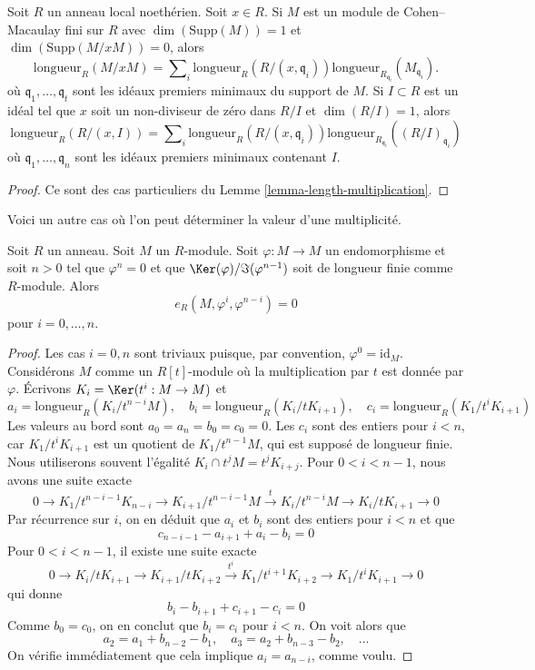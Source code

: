 \begin{lemma}
\label{lemma-additivity-divisors-restricted}
Soit $R$ un anneau local noethérien.
Soit $x \in R$. Si $M$ est un module de Cohen--Macaulay fini sur $R$
avec $\dim(\text{Supp}(M)) = 1$ et $\dim(\text{Supp}(M/xM)) = 0$, alors
$$
\text{longueur}_R(M/xM)
=
\sum\nolimits_i \text{longueur}_R(R/(x, \mathfrak q_i))
\text{longueur}_{R_{\mathfrak q_i}}(M_{\mathfrak q_i}).
$$
où $\mathfrak q_1, \ldots, \mathfrak q_t$ sont les idéaux premiers
minimaux du support de $M$. Si $I \subset R$ est un idéal
tel que $x$ soit un non-diviseur de zéro dans $R/I$ et $\dim(R/I) = 1$, alors
$$
\text{longueur}_R(R/(x, I))
=
\sum\nolimits_i \text{longueur}_R(R/(x, \mathfrak q_i))
\text{longueur}_{R_{\mathfrak q_i}}((R/I)_{\mathfrak q_i})
$$
où $\mathfrak q_1, \ldots, \mathfrak q_n$ sont les idéaux premiers minimaux
contenant $I$.
\end{lemma}

\begin{proof}
Ce sont des cas particuliers du Lemme \ref{lemma-length-multiplication}.
\end{proof}

\noindent
Voici un autre cas où l'on peut déterminer la valeur d'une multiplicité.

\begin{lemma}
\label{lemma-powers-period-length-zero}
Soit $R$ un anneau. Soit $M$ un $R$-module.
Soit $\varphi : M \to M$ un endomorphisme et soit $n > 0$
tel que $\varphi^n = 0$ et que $\Ker(\varphi)/\Im(\varphi^{n - 1})$
soit de longueur finie comme $R$-module.
Alors
$$
e_R(M, \varphi^i, \varphi^{n - i}) = 0
$$
pour $i = 0, \ldots, n$.
\end{lemma}

\begin{proof}
Les cas $i = 0, n$ sont triviaux puisque, par convention, $\varphi^0 = \text{id}_M$.
Considérons $M$ comme un $R[t]$-module où la multiplication par $t$
est donnée par $\varphi$. Écrivons
$K_i = \Ker(t^i : M \to M)$ et
$$
a_i = \text{longueur}_R(K_i/t^{n - i}M),\quad
b_i = \text{longueur}_R(K_i/tK_{i + 1}),\quad
c_i = \text{longueur}_R(K_1/t^iK_{i + 1})
$$
Les valeurs au bord sont $a_0 = a_n = b_0 = c_0 = 0$.
Les $c_i$ sont des entiers pour $i < n$, car $K_1/t^iK_{i + 1}$
est un quotient de $K_1/t^{n - 1}M$, qui est supposé de longueur finie.
Nous utiliserons souvent l'égalité $K_i \cap t^jM = t^jK_{i + j}$.
Pour $0 < i < n - 1$, nous avons une suite exacte
$$
0 \to
K_1/t^{n - i - 1}K_{n - i} \to
K_{i + 1}/t^{n - i - 1}M \xrightarrow{t} K_i/t^{n - i}M
\to K_i/tK_{i + 1} \to 0
$$
Par récurrence sur $i$, on en déduit que $a_i$ et $b_i$ sont
des entiers pour $i < n$ et que
$$
c_{n - i - 1} - a_{i + 1} + a_i - b_i = 0
$$
Pour $0 < i < n - 1$, il existe une suite exacte
$$
0 \to
K_i/tK_{i + 1} \to
K_{i + 1}/tK_{i + 2} \xrightarrow{t^i}
K_1/t^{i + 1}K_{i + 2} \to
K_1/t^iK_{i + 1} \to 0
$$
qui donne
$$
b_i - b_{i + 1} + c_{i + 1} - c_i = 0
$$
Comme $b_0 = c_0$, on en conclut que $b_i = c_i$ pour $i < n$.
On voit alors que
$$
a_2 = a_1 + b_{n - 2} - b_1,\quad
a_3 = a_2 + b_{n - 3} - b_2,\quad \ldots
$$
On vérifie immédiatement que cela implique $a_i = a_{n - i}$, comme voulu.
\end{proof}

